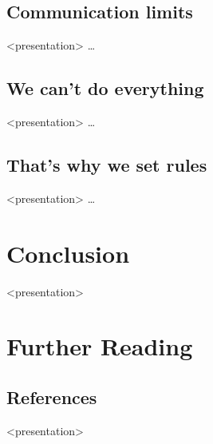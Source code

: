 %
\subsection{Communication limits}

  \begin{frame}<presentation>%
    \dots
  \end{frame}

%
\subsection{We can't do everything}

  \begin{frame}<presentation>%
    \dots
  \end{frame}

%
\subsection{That's why we set rules}

  \begin{frame}<presentation>%
    \dots
  \end{frame}

\section*{Conclusion}

  \begin{frame}<presentation>%
  \end{frame}

\appendix

\section{Further Reading}

%
\subsection{References}

  \begin{frame}<presentation>{\insertsubsection}
    {}
    
    \nocite{maturana2004maquinas}
    \nocite{johnson2002emergence}
    \nocite{beck2004extreme}
    \nocite{pink2011drive}
  \end{frame}

